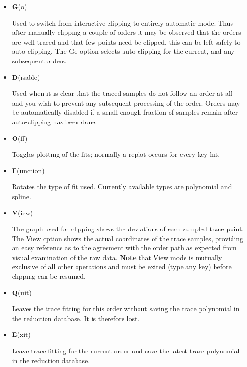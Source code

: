 \documentclass[11pt,twoside]{article}
\newcommand{\sunspec}[2]{#1}
\renewcommand{\sunspec}[2]{#2}
\begin{document}
\begin{itemize}
\item {\sunspec{\Large\tt}{\bf} G}(o)

     Used to switch from interactive clipping to entirely
     automatic mode. Thus after manually clipping a couple of orders
     it may be observed that the orders are well traced and that few
     points need be clipped, this can be left safely to auto-clipping.
     The Go option selects auto-clipping for the current, and any
     subsequent orders.

\item {\sunspec{\Large\tt}{\bf} D}(isable)

     Used when it is clear that the traced samples do not
     follow an order at all and you wish to prevent any subsequent
     processing of the order.  Orders may be automatically disabled
     if a small enough fraction of samples remain after auto-clipping
     has been done.

\item {\sunspec{\Large\tt}{\bf} O}(ff)

     Toggles plotting of the fits; normally a replot occurs for every
     key hit.

\item {\sunspec{\Large\tt}{\bf} F}(unction)

     Rotates the type of fit used.  Currently available types
     are polynomial and spline.

\item {\sunspec{\Large\tt}{\bf} V}(iew)

     The graph used for clipping shows the deviations of each
     sampled trace point. The View option shows the actual coordinates
     of the trace samples, providing an easy reference as to the agreement
     with the order path as expected from visual examination of the raw data.
     {\bf Note} that View mode is mutually exclusive of all other operations
     and must be exited (type any key) before clipping can be resumed.

\item {\sunspec{\Large\tt}{\bf} Q}(uit)

     Leaves the trace fitting for this order without saving
     the trace polynomial in the reduction database. It is therefore
     lost.

\item {\sunspec{\Large\tt}{\bf} E}(xit)

     Leave trace fitting for the current order and save the
     latest trace polynomial in the reduction database.


\end{itemize}
\end{document}

